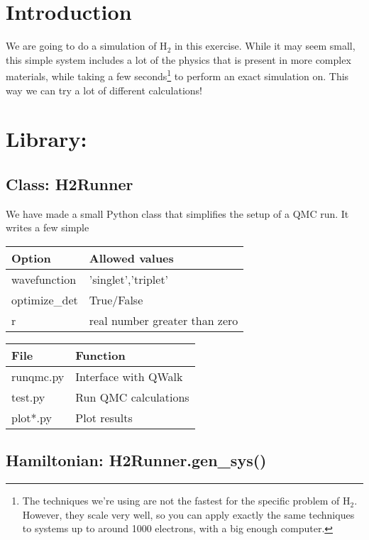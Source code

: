 \documentclass[12pt]{article}
\begin{document}
\section*{Introduction}

We are going to do a simulation of H$_2$ in this exercise. 
While it may seem small, this simple system includes a lot of the physics that is present in more complex materials, while taking a few seconds\footnote{The techniques we're using are not the fastest for the specific problem of H$_2$. However, they scale very well, so you can apply exactly the same techniques to systems up to around 1000 electrons, with a big enough computer.} to perform an exact simulation on. 
This way we can try a lot of different calculations!

\section*{Library: }

\subsection*{Class: H2Runner}

We have made a small Python class that simplifies the setup of a QMC run. 
It writes a few simple 

\begin{table}
\begin{tabular}{lp{}}
Option & Allowed values \\
\hline
wavefunction & 'singlet','triplet'\\
optimize\_det & True/False \\
r & real number greater than zero \\
\end{tabular}
\end{table}


\begin{table}
\begin{tabular}{lp{}}
File & Function \\
\hline
runqmc.py & Interface with QWalk\\
test.py & Run QMC calculations \\
plot*.py & Plot results \\
\end{tabular}
\end{table}


\subsection*{Hamiltonian: H2Runner.gen\_sys() }
\end{document}
